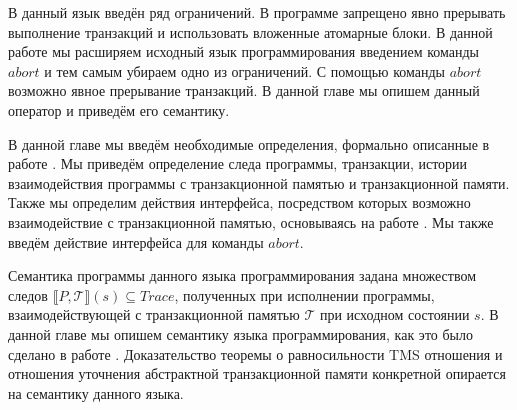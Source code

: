 В данный язык \cite{tms_article} введён ряд ограничений. В программе запрещено явно прерывать выполнение транзакций и использовать вложенные атомарные блоки. В данной работе мы расширяем исходный язык программирования введением команды $abort$ и тем самым убираем одно из ограничений. С помощью команды $abort$ возможно явное прерывание транзакций. В данной главе мы опишем данный оператор и приведём его семантику.

В данной главе мы введём необходимые определения, формально описанные в работе \cite{tms_article}. Мы приведём определение следа программы, транзакции, истории взаимодействия программы с транзакционной памятью и транзакционной памяти. Также мы определим действия интерфейса, посредством которых возможно взаимодействие с транзакционной памятью, основываясь на работе \cite{tms_article}. Мы также введём действие интерфейса для команды $abort$.

Семантика программы данного языка программирования задана множеством следов $\llbracket P, \mathcal{T} \rrbracket (s) \subseteq Trace$, полученных при исполнении программы, взаимодействующей с транзакционной памятью $\mathcal{T}$ при исходном состоянии $s$. В данной главе мы опишем семантику языка программирования, как это было сделано в работе \cite{tms_article}. Доказательство теоремы о равносильности TMS отношения и отношения уточнения абстрактной транзакционной памяти конкретной опирается на семантику данного языка. 

